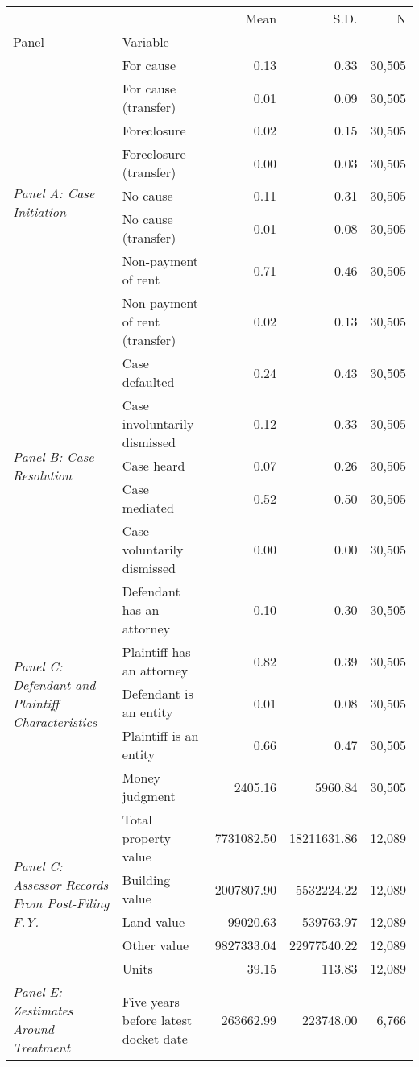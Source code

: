 \begin{tabular}{llrrr}
\toprule
 &  & Mean & S.D. & N \\
Panel & Variable &  &  &  \\
\midrule
\multirow[c]{8}{4cm}{\textit{Panel A: Case Initiation}} & For cause & 0.13 & 0.33 & 30,505 \\
 & For cause (transfer) & 0.01 & 0.09 & 30,505 \\
 & Foreclosure & 0.02 & 0.15 & 30,505 \\
 & Foreclosure (transfer) & 0.00 & 0.03 & 30,505 \\
 & No cause & 0.11 & 0.31 & 30,505 \\
 & No cause (transfer) & 0.01 & 0.08 & 30,505 \\
 & Non-payment of rent & 0.71 & 0.46 & 30,505 \\
 & Non-payment of rent (transfer) & 0.02 & 0.13 & 30,505 \\
\cline{1-5}
\multirow[c]{5}{4cm}{\textit{Panel B: Case Resolution}} & Case defaulted & 0.24 & 0.43 & 30,505 \\
 & Case involuntarily dismissed & 0.12 & 0.33 & 30,505 \\
 & Case heard & 0.07 & 0.26 & 30,505 \\
 & Case mediated & 0.52 & 0.50 & 30,505 \\
 & Case voluntarily dismissed & 0.00 & 0.00 & 30,505 \\
\cline{1-5}
\multirow[c]{5}{4cm}{\textit{Panel C: Defendant and Plaintiff Characteristics}} & Defendant has an attorney & 0.10 & 0.30 & 30,505 \\
 & Plaintiff has an attorney & 0.82 & 0.39 & 30,505 \\
 & Defendant is an entity & 0.01 & 0.08 & 30,505 \\
 & Plaintiff is an entity & 0.66 & 0.47 & 30,505 \\
 & Money judgment & 2405.16 & 5960.84 & 30,505 \\
\cline{1-5}
\multirow[c]{5}{4cm}{\textit{Panel C: Assessor Records From Post-Filing F.Y.}} & Total property value & 7731082.50 & 18211631.86 & 12,089 \\
 & Building value & 2007807.90 & 5532224.22 & 12,089 \\
 & Land value & 99020.63 & 539763.97 & 12,089 \\
 & Other value & 9827333.04 & 22977540.22 & 12,089 \\
 & Units & 39.15 & 113.83 & 12,089 \\
\cline{1-5}
\multirow[c]{9}{4cm}{\textit{Panel E: Zestimates Around Treatment}} & Five years before latest docket date & 263662.99 & 223748.00 & 6,766 \\

\end{tabular}
